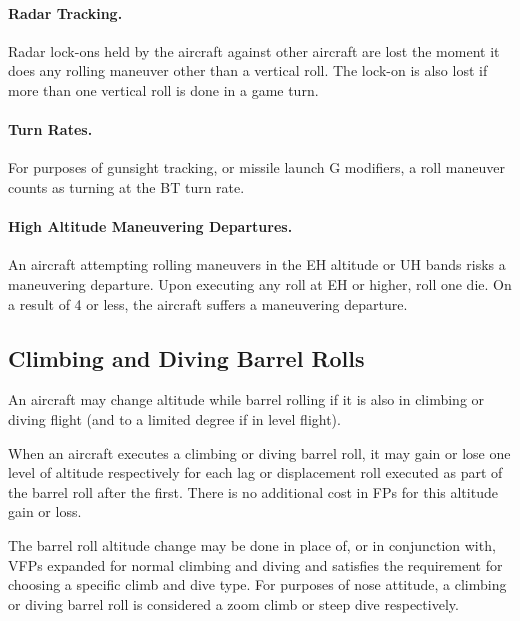 \paragraph{Radar Tracking.} Radar lock-ons held by the aircraft against other aircraft are lost the moment it does any rolling maneuver other than a vertical roll. The lock-on is also lost if more than one vertical roll is done in a game turn.

\paragraph{Turn Rates.} For purposes of gunsight tracking, or missile launch G modifiers, a roll maneuver counts as turning at the BT turn rate.

\paragraph{High Altitude Maneuvering Departures.} An aircraft attempting rolling maneuvers in the EH altitude or UH bands risks a maneuvering departure. Upon executing any roll at EH or higher, roll one die. On a result of 4 or less, the aircraft suffers a maneuvering departure.

\advancedrules

\subsection{Climbing and Diving Barrel Rolls}

An aircraft may change altitude while barrel rolling if it is also in climbing or diving flight (and to a limited degree if in level flight).

When an aircraft executes a climbing or diving barrel roll, it may gain or lose one level of altitude respectively for each lag or displacement roll  {executed as part of} the barrel roll after the first. There is no additional cost in FPs for this altitude gain or loss.

The barrel roll altitude change may be done in place of, or in conjunction with, VFPs expanded for normal climbing and diving and satisfies the requirement for choosing a specific climb and dive type. For purposes of nose attitude, a climbing or diving barrel roll is considered a zoom climb or steep dive respectively.


